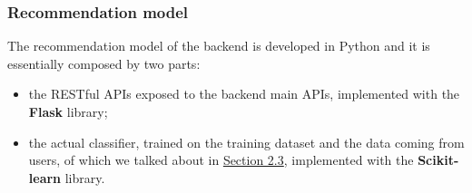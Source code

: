 \documentclass[../../main]{subfiles}
\begin{document}
\subsubsection{Recommendation model}
\label{sss:recommendation-model-development}

The recommendation model of the backend is developed in Python and it is essentially composed by two parts:
\begin{itemize}
    \item the RESTful APIs exposed to the backend main APIs, implemented with the \textbf{Flask} library;
    \item the actual classifier, trained on the training dataset and the data coming from users, of which we talked about in \hyperref[sss:recommendation-model-design]{Section 2.3}, implemented with the \textbf{Scikit-learn} library.
\end{itemize}

\end{document}
